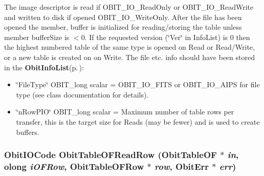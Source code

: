 The image descriptor is read if OBIT\_\-IO\_\-Read\-Only or OBIT\_\-IO\_\-Read\-Write and written to disk if opened OBIT\_\-IO\_\-Write\-Only. After the file has been opened the member, buffer is initialized for reading/storing the table unless member buffer\-Size is $<$0. If the requested version (\char`\"{}Ver\char`\"{} in Info\-List) is 0 then the highest numbered table of the same type is opened on Read or Read/Write, or a new table is created on on Write. The file etc. info should have been stored in the {\bf Obit\-Info\-List}{\rm (p.\,\pageref{structObitInfoList})}: \begin{itemize}
\item \char`\"{}File\-Type\char`\"{} OBIT\_\-long scalar = OBIT\_\-IO\_\-FITS or OBIT\_\-IO\_\-AIPS for file type (see class documentation for details). \item \char`\"{}n\-Row\-PIO\char`\"{} OBIT\_\-long scalar = Maximum number of table rows per transfer, this is the target size for Reads (may be fewer) and is used to create buffers. 
\end{itemize}
\subsubsection{\setlength{\rightskip}{0pt plus 5cm}Obit\-IOCode Obit\-Table\-OFRead\-Row ({\bf Obit\-Table\-OF} $\ast$ {\em in}, {\bf olong} {\em i\-OFRow}, {\bf Obit\-Table\-OFRow} $\ast$ {\em row}, {\bf Obit\-Err} $\ast$ {\em err})}\label{ObitTableOF_8c_a22}


